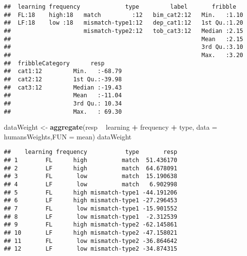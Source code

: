 \documentclass[
]{article}
\newenvironment{Shaded}{\begin{snugshade}}{\end{snugshade}}
\newcommand{\DataTypeTok}[1]{\textcolor[rgb]{0.13,0.29,0.53}{#1}}
\newcommand{\KeywordTok}[1]{\textcolor[rgb]{0.13,0.29,0.53}{\textbf{#1}}}
\newcommand{\NormalTok}[1]{#1}
\newcommand{\OperatorTok}[1]{\textcolor[rgb]{0.81,0.36,0.00}{\textbf{#1}}}
\newcommand{\StringTok}[1]{\textcolor[rgb]{0.31,0.60,0.02}{#1}}
\begin{document}
\begin{verbatim}
##  learning frequency             type         label       fribble    
##  FL:18    high:18   match         :12   bim_cat2:12   Min.   :1.10  
##  LF:18    low :18   mismatch-type1:12   dep_cat1:12   1st Qu.:1.20  
##                     mismatch-type2:12   tob_cat3:12   Median :2.15  
##                                                       Mean   :2.15  
##                                                       3rd Qu.:3.10  
##                                                       Max.   :3.20  
##  fribbleCategory      resp       
##  cat1:12         Min.   :-68.79  
##  cat2:12         1st Qu.:-39.98  
##  cat3:12         Median :-19.43  
##                  Mean   :-11.04  
##                  3rd Qu.: 10.34  
##                  Max.   : 69.30
\end{verbatim}

\begin{Shaded}
\begin{Highlighting}[]
\NormalTok{dataWeight <-}\StringTok{ }\KeywordTok{aggregate}\NormalTok{(resp }\OperatorTok{~}\StringTok{ }\NormalTok{learning }\OperatorTok{+}\StringTok{ }\NormalTok{frequency }\OperatorTok{+}\StringTok{ }\NormalTok{type, }\DataTypeTok{data =}\NormalTok{ humansWeights,}\DataTypeTok{FUN =}\NormalTok{ mean)}
\NormalTok{dataWeight}
\end{Highlighting}
\end{Shaded}

\begin{verbatim}
##    learning frequency           type       resp
## 1        FL      high          match  51.436170
## 2        LF      high          match  64.678091
## 3        FL       low          match  15.190638
## 4        LF       low          match   6.902998
## 5        FL      high mismatch-type1 -44.191206
## 6        LF      high mismatch-type1 -27.296453
## 7        FL       low mismatch-type1 -15.901552
## 8        LF       low mismatch-type1  -2.312539
## 9        FL      high mismatch-type2 -62.145861
## 10       LF      high mismatch-type2 -47.158021
## 11       FL       low mismatch-type2 -36.864642
## 12       LF       low mismatch-type2 -34.874315
\end{verbatim}
\end{document}
